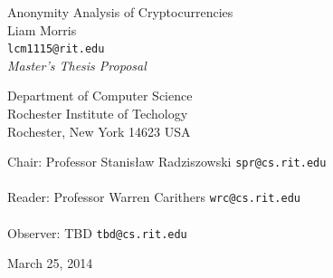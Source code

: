 \documentclass[11pt]{article}
\begin{document}
\thispagestyle{empty}
\begin{center}
{\huge Anonymity Analysis of Cryptocurrencies} \\
\vspace{3em}
{\LARGE Liam Morris} \\
{\tt lcm1115@rit.edu} \\
\vspace{3em}
\emph{Master's Thesis Proposal} \\
\begin{small}
Department of Computer Science \\
Rochester Institute of Techology \\
Rochester, New York 14623 USA \\
\end{small}
\vspace{4em}
\begin{adjustwidth}{.5in}{.5in}
Chair: Professor Stanis{\l}aw Radziszowski \hfill {\tt spr@cs.rit.edu} \\
\vspace{.5em}
\hrulefill \\
\vspace{1em}
Reader: Professor Warren Carithers \hfill {\tt wrc@cs.rit.edu} \\
\vspace{.5em}
\hrulefill \\
\vspace{1em}
Observer: TBD \hfill {\tt tbd@cs.rit.edu} \\
\vspace{.5em}
\hrulefill
\end{adjustwidth}
\vspace{2em}
March 25, 2014
\end{center}
\pagebreak
\thispagestyle{empty}
\end{document}

